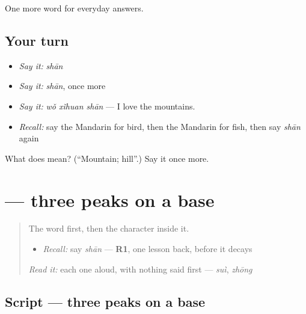 \begin{grammarlens}[title={What you've built}]
One more word for everyday answers.
\end{grammarlens}

\subsection*{Your turn}
\begin{itemize}
\raggedright
  \item \emph{Say it:} \emph{shān}
  \item \emph{Say it:} \emph{shān}, once more
  \item \emph{Say it:} \emph{wǒ xǐhuan shān} — I love the mountains.
  \item \emph{Recall:} say the Mandarin for bird, then the Mandarin for fish, then say \emph{shān} again
\end{itemize}

\begin{tcolorbox}[breakable,colback=teal!4,colframe=teal!35!black,title={Before you move on}]
What does  mean? (\textquotedblleft{}Mountain; hill\textquotedblright{}.) Say it once more.
\end{tcolorbox}
\section[\texorpdfstring{\zh{山} (shān)}{山 (shān)}]{ — three peaks on a base}

\label{lesson:ZH-W68-shan}



\begin{quote}
The word first, then the character inside it.

\begin{itemize}
\raggedright
  \item \emph{Recall:} say \emph{shān} — \textbf{R1}, one lesson back, before it decays
\end{itemize}

\begin{quote}
 
\end{quote}

\emph{Read it:} each one aloud, with nothing said first — \emph{suì}, \emph{zhōng}
\end{quote}

\subsection*{Script — three peaks on a base}

